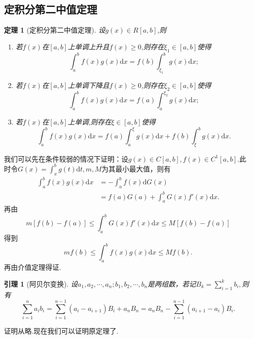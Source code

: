 \documentclass[UTF8]{article}
\newcommand{\dx}{\mathrm{d}x}
\newtheorem{thm}{\hspace{2em}定理}[section]
\newtheorem{lem}{\hspace{2em}引理}[section]
\begin{document}
\subsection{定积分第二中值定理}
\begin{thm}[定积分第二中值定理]
  设$g(x)\in R[a,b]$,则
  \begin{enumerate}
    \item 若$f(x)$在$[a,b]$上单调上升且$f(x)\ge0$,则存在$\xi_1\in[a,b]$使得
    $$\int_a^bf(x)g(x)\dx=f(b)\int_{\xi_1}^bg(x)\dx;$$
    \item 若$f(x)$在$[a,b]$上单调下降且$f(x)\ge0$,则存在$\xi_2\in[a,b]$使得
    $$\int_a^bf(x)g(x)\dx=f(a)\int_a^{\xi_2}g(x)\dx;$$
    \item 若$f(x)$在$[a,b]$上单调,则存在$\xi\in[a,b]$使得
    $$\int_a^bf(x)g(x)\dx=f(a)\int_a^\xi g(x)\dx+f(b)\int_\xi^bg(x)\dx.$$
  \end{enumerate}
\end{thm}
我们可以先在条件较弱的情况下证明：设$g(x)\in C[a,b],f(x)\in C^1[a,b].$此时令$G(x)=\displaystyle\int_x^bg(t)\mathrm{d}t,
m,M$为其最小最大值，则有
\begin{align*}
  \int_a^bf(x)g(x)\dx&=-\int_a^bf(x)\mathrm{d}G(x)\\
  &=f(a)G(a)+\int_a^bG(x)f'(x)\dx.
\end{align*}
再由
$$m[f(b)-f(a)]\le\displaystyle\int_a^bG(x)f'(x)\dx\le M[f(b)-f(a)]$$
得到
$$mf(b)\le\displaystyle\int_a^bf(x)g(x)\dx\le Mf(b).$$再由介值定理得证.
\begin{lem}[阿贝尔变换]
  设$a_1,a_2,\cdots,a_n;b_1,b_2,\cdots,b_n$是两组数，若记$B_k=\sum\limits_{i=1}^kb_i,$则有
  $$\sum_{i=1}^na_ib_i=\sum_{i=1}^{n-1}(a_i-a_{i+1})B_i+a_nB_n=a_nB_n-\sum_{i=1}^{n-1}(a_{i+1}-a_i)B_i.$$
\end{lem}
证明从略.现在我们可以证明原定理了.
\end{document}
